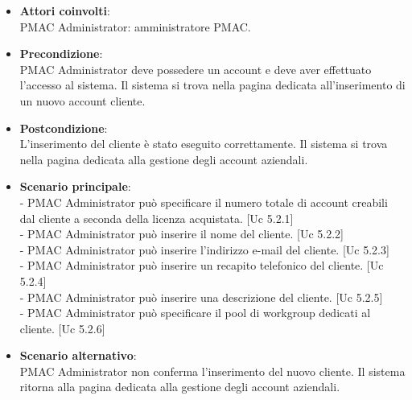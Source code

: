 \documentclass[10pt,a4paper]{article}
\begin{document}
\begin{itemize}
\item \textbf{Attori coinvolti}:\\
PMAC Administrator: amministratore PMAC.

\item \textbf{Precondizione}:\\
PMAC Administrator deve possedere un account e deve aver effettuato l'accesso al sistema. Il sistema si trova nella pagina dedicata all'inserimento di un nuovo account cliente.

\item \textbf{Postcondizione}:\\
L'inserimento del cliente è stato eseguito correttamente. Il sistema si trova nella pagina dedicata alla gestione degli account aziendali.

\item \textbf{Scenario principale}:\\
- PMAC Administrator può specificare il numero totale di account creabili dal cliente a seconda della licenza acquistata. [Uc 5.2.1]\\
- PMAC Administrator può inserire il nome del cliente. [Uc 5.2.2]\\
- PMAC Administrator può inserire l'indirizzo e-mail del cliente. [Uc 5.2.3]\\
- PMAC Administrator può inserire un recapito telefonico del cliente. [Uc 5.2.4]\\
- PMAC Administrator può inserire una descrizione del cliente. [Uc 5.2.5]\\
- PMAC Administrator può specificare il pool di workgroup dedicati al cliente. [Uc 5.2.6]

\item \textbf{Scenario alternativo}:\\
PMAC Administrator non conferma l'inserimento del nuovo cliente. Il sistema ritorna alla pagina dedicata alla gestione degli account aziendali.

\end{itemize}

\end{document}
